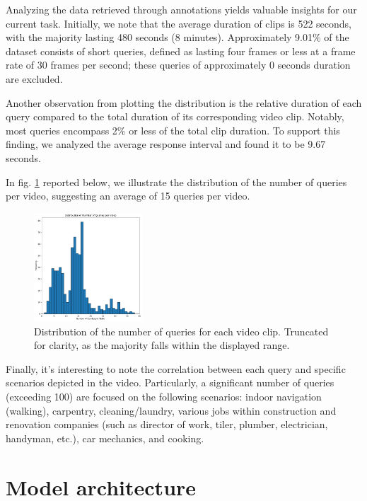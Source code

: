 \documentclass[10pt,twocolumn,letterpaper]{article}
\begin{document}
Analyzing the data retrieved through annotations yields valuable insights for our current task. Initially, we note that the average duration of clips is 522 seconds, with the majority lasting 480 seconds (8 minutes). Approximately 9.01\% of the dataset consists of short queries, defined as lasting four frames or less at a frame rate of 30 frames per second; these queries of approximately 0 seconds duration are excluded.

Another observation from plotting the distribution is the relative duration of each query compared to the total duration of its corresponding video clip. Notably, most queries encompass 2\% or less of the total clip duration. To support this finding, we analyzed the average response interval and found it to be 9.67 seconds.

In fig. \ref{fig:figure2} reported below, we illustrate the distribution of the number of queries per video, suggesting an average of 15 queries per video.

\begin{figure}[h]
\centering
\includegraphics[width=0.36\textwidth]{Figure2.pdf} %
\caption{Distribution of the number of queries for each video clip. Truncated for clarity, as the majority falls within the displayed range.}
\label{fig:figure2}
\end{figure}

Finally, it's interesting to note the correlation between each query and specific scenarios depicted in the video. Particularly, a significant number of queries (exceeding 100) are focused on the following scenarios: indoor navigation (walking), carpentry, cleaning/laundry, various jobs within construction and renovation companies (such as director of work, tiler, plumber, electrician, handyman, etc.), car mechanics, and cooking.


\section{Model architecture}
\label{sec:vslnet}
\end{document}
